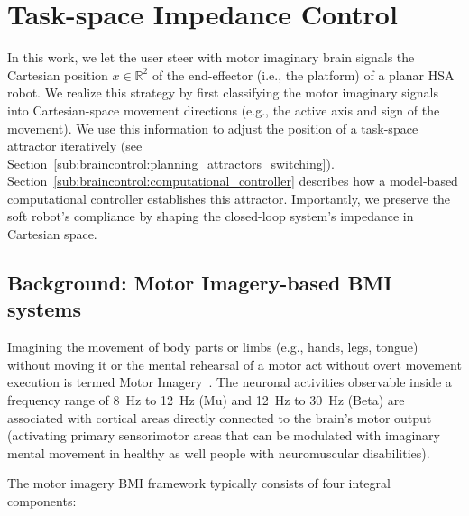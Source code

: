 \section{Task-space Impedance Control}
In this work, we let the user steer with motor imaginary brain signals the Cartesian position $x \in \mathbb{R}^2$ of the end-effector (i.e., the platform) of a planar \gls{HSA} robot.
We realize this strategy by first classifying the motor imaginary signals into Cartesian-space movement directions (e.g., the active axis and sign of the movement). We use this information to adjust the position of a task-space attractor iteratively (see Section~\ref{sub:braincontrol:planning_attractors_switching}). Section~\ref{sub:braincontrol:computational_controller} describes how a model-based computational controller establishes this attractor. Importantly, we preserve the soft robot's compliance by shaping the closed-loop system's impedance in Cartesian space.


\subsection{Background: Motor Imagery-based BMI systems}\label{sub:braincontrol:motor_imagery_bmi}

Imagining the movement of body parts or limbs (e.g., hands, legs, tongue) without moving it or the mental rehearsal of a motor act without overt movement execution is termed Motor Imagery~\cite{lotze2006motor}.  The neuronal activities observable inside a frequency range of \SI{8}{Hz} to \SI{12}{Hz} (Mu) and \SI{12}{Hz} to \SI{30}{Hz} (Beta) are associated with cortical areas directly connected to the brain’s motor output (activating primary sensorimotor areas that can be modulated with imaginary mental movement in healthy as well people with neuromuscular disabilities). 

The motor imagery \gls{BMI} framework typically consists of four integral components:

